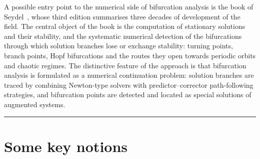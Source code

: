 \documentclass[11pt]{article}
\begin{document}
A possible entry point to the numerical side of bifurcation
analysis is the book of Seydel~\cite{seydel2010}, whose third
edition summarises three decades of development of the field.
The central object of the book is the computation of
stationary solutions and their stability, and the systematic
numerical detection of the bifurcations through which solution
branches lose or exchange stability: turning points,
branch points, Hopf bifurcations and the routes they open
towards periodic orbits and chaotic regimes. The distinctive
feature of the approach is that bifurcation analysis is
formulated as a numerical continuation problem: solution
branches are traced by combining Newton-type solvers with
predictor--corrector path-following strategies, and
bifurcation points are detected and located as special
solutions of augmented systems. 


\vspace{0.5cm}
\hrule
\vspace{0.5cm}

\section{Some key notions}
\end{document}
